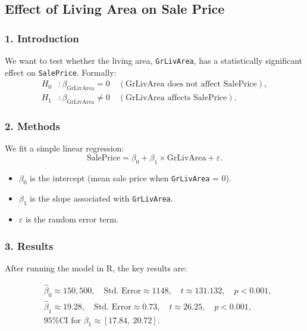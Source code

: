 \documentclass{article}
\begin{document}
\vspace{1em}

\subsection*{Effect of Living Area on Sale Price}

\subsubsection*{1. Introduction}
We want to test whether the living area, \texttt{GrLivArea}, has a statistically significant effect on \texttt{SalePrice}. Formally:
\[
\begin{aligned}
H_0 &: \beta_{\text{GrLivArea}} = 0 \quad (\text{GrLivArea does not affect SalePrice}),\\
H_1 &: \beta_{\text{GrLivArea}} \neq 0 \quad (\text{GrLivArea affects SalePrice}).
\end{aligned}
\]

\subsubsection*{2. Methods}
We fit a simple linear regression:
\[
\text{SalePrice} = \beta_0 + \beta_1 \times \text{GrLivArea} + \varepsilon.
\]
\begin{itemize}
    \item \(\beta_0\) is the intercept (mean sale price when \texttt{GrLivArea} = 0).
    \item \(\beta_1\) is the slope associated with \texttt{GrLivArea}.
    \item \(\varepsilon\) is the random error term.
\end{itemize}

\subsubsection*{3. Results}
After running the model in R, the key results are:

\[
\begin{aligned}
& \hat{\beta}_0 \approx 150{,}500, 
  \quad \text{Std.~Error} \approx 1148, 
  \quad t \approx 131.132, 
  \quad p < 0.001, \\
& \hat{\beta}_1 \approx 19.28, 
  \quad \text{Std.~Error} \approx 0.73, 
  \quad t \approx 26.25, 
  \quad p < 0.001, \\
& \text{95\% CI for } \beta_1 \approx [17.84,\ 20.72].
\end{aligned}
\]
\end{document}
